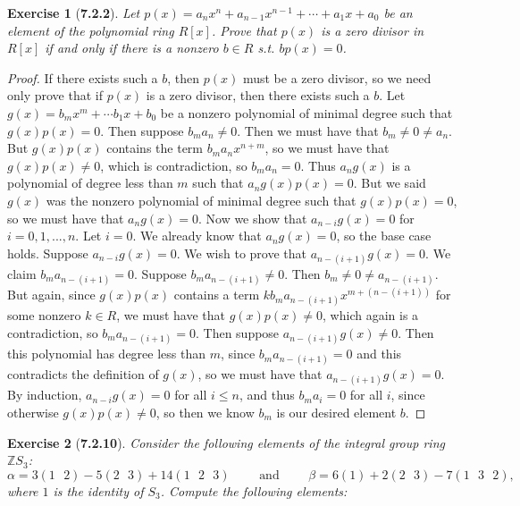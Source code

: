 \documentclass[10pt,oneside,reqno]{amsart}
\theoremstyle{plain}
\newtheorem*{e}{Exercise}
\theoremstyle{definition}
\begin{document}
\begin{e}[\textbf{7.2.2}]
Let $p(x) = a_nx^n + a_{n - 1}x^{n - 1} + \cdots + a_1x + a_0$ be an element of the polynomial ring $R[x]$. Prove that $p(x)$ is a zero divisor in $R[x]$ if and only if there is a nonzero $b \in R$ s.t. $bp(x) = 0$. 
\end{e}
\begin{proof}
If there exists such a $b$, then $p(x)$ must be a zero divisor, so we need only prove that if $p(x)$ is a zero divisor, then there exists such a $b$. Let $g(x) = b_mx^m + \cdots b_1x + b_0$ be a nonzero polynomial of minimal degree such that $g(x)p(x) = 0$. Then suppose $b_ma_n \neq 0$. Then we must have that $b_m \neq 0 \neq a_n$. But $g(x)p(x)$ contains the term $b_ma_nx^{n + m}$, so we must have that $g(x)p(x) \neq 0$, which is contradiction, so $b_ma_n = 0$. Thus $a_ng(x)$ is a polynomial of degree less than $m$ such that $a_ng(x)p(x) = 0$. But we said $g(x)$ was the nonzero polynomial of minimal degree such that $g(x)p(x) = 0$, so we must have that $a_ng(x) = 0$. Now we show that $a_{n - i}g(x) = 0$ for $i = 0,1,...,n$. Let $i = 0$. We already know that $a_ng(x) = 0$, so the base case holds. Suppose $a_{n - i}g(x) = 0$. We wish to prove that $a_{n - (i + 1)}g(x) = 0$. We claim $b_ma_{n - (i + 1)} = 0$. Suppose $b_ma_{n - (i + 1)} \neq 0$. Then $b_m \neq 0 \neq a_{n - (i + 1)}$. But again, since $g(x)p(x)$ contains a term $kb_ma_{n - (i + 1)}x^{m + (n - (i + 1))}$ for some nonzero $k \in R$, we must have that $g(x)p(x) \neq 0$, which again is a contradiction, so $b_ma_{n - (i  +1)} = 0$. Then suppose $a_{n - (i + 1)}g(x) \neq 0$. Then this polynomial has degree less than $m$, since $b_ma_{n - (i + 1)} = 0$ and this contradicts the definition of $g(x)$, so we must have that $a_{n - (i + 1)}g(x) = 0$. By induction, $a_{n - i}g(x) = 0$ for all $i \leq n$, and thus $b_ma_i = 0$ for all $i$, since otherwise $g(x)p(x) \neq 0$, so then we know $b_m$ is our desired element $b$. 
\end{proof}


\begin{e}[\textbf{7.2.10}]
Consider the following elements of the integral group ring $\mathbb{Z}S_3$:
\[\alpha = 3(1 \text{ }2) - 5(2 \text{ }3) + 14(1\text{ } 2\text{ } 3) \text{ }\text{ }\text{ }\text{     and     }\text{ }\text{ }\text{ } \beta = 6(1) + 2(2\text{ } 3) - 7 (1 \text{ }3\text{ } 2),\]
where $1$ is the identity of $S_3$. Compute the following elements:
\end{e}
\end{document}
